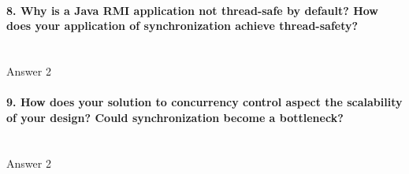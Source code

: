 \documentclass{ds-report}
\begin{document}
	\paragraph{8. Why is a Java RMI application not thread-safe by default? How does your application of synchronization achieve thread-safety?} \mbox{}\\
	Answer 2

	\paragraph{9. How does your solution to concurrency control aspect the scalability of your design? Could
synchronization become a bottleneck?} \mbox{}\\
	Answer 2

	
	\clearpage
	
	
\end{document}
